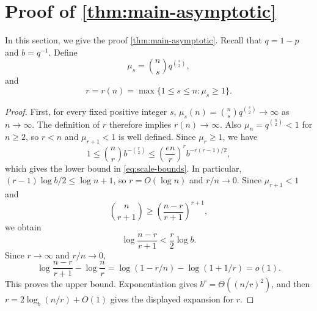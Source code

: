\documentclass[11pt,reqno]{amsart}
\newtheorem{lemma}[theorem]{Lemma}
\theoremstyle{definition}
\theoremstyle{remark}
\begin{document}
\section{Proof of \texorpdfstring{\cref{thm:main-asymptotic}}{Theorem 1.1}}

In this section, we give the proof \cref{thm:main-asymptotic}.
Recall that $q=1-p$ and $b=q^{-1}$.
Define
\begin{equation}\label{eq:mu-lambda}
 \mu_s=\binom ns q^{\binom s2},
\end{equation}
and 
\begin{equation}\label{eq:canonical-r}
 r=r(n)=\max\{1\le s\le n:\mu_s\ge1\}.
\end{equation}




\begin{proof}
First, for every fixed positive integer $s$,
$\mu_s(n)=\binom nsq^{\binom s2}\to\infty$ as $n\to\infty$.
The definition of $r$ therefore implies $r(n)\to\infty$.
Also $\mu_n=q^{\binom n2}<1$ for $n\ge2$, so $r<n$ and
$\mu_{r+1}<1$ is well defined.
Since $\mu_r\ge1$, we have
\[
 1\le\binom nr b^{-\binom r2}
 \le\left(\frac{en}{r}\right)^r b^{-r(r-1)/2},
\]
which gives the lower bound in \eqref{eq:scale-bounds}. In particular,
$(r-1)\log b/2\le\log n+1$, so $r=O(\log n)$ and $r/n\to0$.
Since
$\mu_{r+1}<1$ and
\[
 \binom n{r+1}\ge
 \left(\frac{n-r}{r+1}\right)^{r+1},
\]
we obtain
\[
 \log\frac{n-r}{r+1}<\frac r2\log b.
\]
 Since $r\to\infty$ and $r/n\to0$,
\[
 \log\frac{n-r}{r+1}-\log\frac nr
 =\log(1-r/n)-\log(1+1/r)=o(1).
\]
This proves the upper bound. Exponentiation gives
$b^r=\Theta((n/r)^2)$, and then
$r=2\log_b(n/r)+O(1)$ gives the displayed expansion for $r$.
\end{proof}
\end{document}
